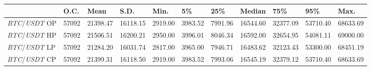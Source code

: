 \begin{tabular}{lllllllllll}
\toprule
 & \textbf{O.C.} & \textbf{Mean} & \textbf{S.D.} & \textbf{Min.} & \textbf{5\%} & \textbf{25\%} & \textbf{Median} & \textbf{75\%} & \textbf{95\%} & \textbf{Max.} \\
\midrule
\emph{BTC}/\emph{USDT} OP & 57092 & 21398.47 & 16118.15 & 2919.00 & 3983.52 & 7991.96 & 16544.60 & 32377.09 & 53710.40 & 68633.69 \\
\emph{BTC}/\emph{USDT} HP & 57092 & 21506.51 & 16200.21 & 2950.00 & 3996.01 & 8046.34 & 16592.00 & 32654.95 & 54081.11 & 69000.00 \\
\emph{BTC}/\emph{USDT} LP & 57092 & 21284.20 & 16031.74 & 2817.00 & 3965.00 & 7946.71 & 16483.62 & 32123.43 & 53300.00 & 68451.19 \\
\emph{BTC}/\emph{USDT} CP & 57092 & 21399.31 & 16118.50 & 2919.00 & 3983.52 & 7993.06 & 16545.19 & 32379.12 & 53710.40 & 68633.69 \\
\bottomrule
\end{tabular}
